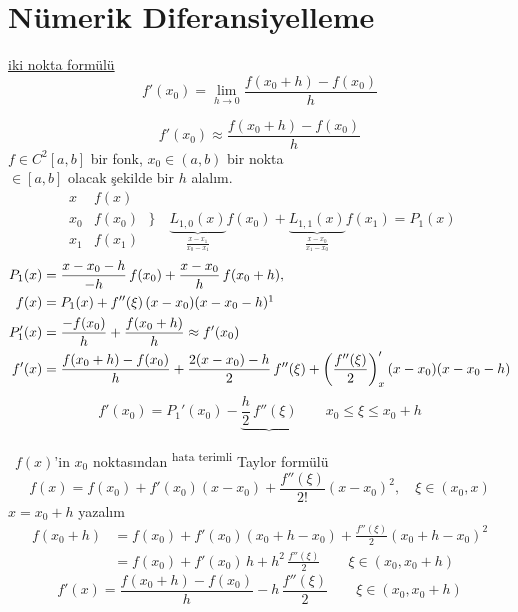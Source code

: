 \documentclass[11pt,a4paper]{article}
\begin{document}

\section{Nümerik Diferansiyelleme}
\noindent\underline{\small iki nokta formülü}
\[
  f'(x_0) = \lim_{h\to 0}\frac{f(x_0+h) - f(x_0)}{h}
\]
\begin{center}
\end{center}
\[
  f'(x_0) \approx \frac{f(x_0+h) - f(x_0)}{h}
\]
$f \in C^2[a,b]$ bir fonk, \quad $x_0 \in (a,b)$ bir nokta\\
 $\in [a,b]$ olacak şekilde bir $h$ alalım.
\[
  \begin{array}{c|c}
    x & f(x)\\ \hline
    x_0 & f(x_0)\\
    x_1 & f(x_1)
  \end{array}
  \;\Bigg\}\quad
  \underbrace{L_{1,0}(x)}_{\frac{x-x_1}{x_0-x_1}}f(x_0) + \underbrace{L_{1,1}(x)}_{\frac{x-x_0}{x_1-x_0}}f(x_1) = P_1(x)
\]
\begin{align*}
  P_1(x) &= \frac{x - x_0 - h}{-h}\,f(x_0) + \frac{x - x_0}{h}\,f(x_0+h),\\
  f(x) &= P_1(x) + f''(\xi)\,(x-x_0)(x-x_0-h)\footnotemark\\
  P_1'(x) &= \frac{-f(x_0)}{h} + \frac{f(x_0+h)}{h} \approx f'(x_0)\\
  f'(x) &= \frac{f(x_0+h) - f(x_0)}{h} + \frac{2(x-x_0) - h}{2}\,f''(\xi)
           + \left(\frac{f''(\xi)}{2}\right)'_x (x-x_0)(x-x_0-h)
\end{align*}
\[
  f'(x_0) = P_1'(x_0) - \underbrace{\frac{h}{2}\,f''(\xi)}_{} \qquad x_0 \le \xi \le x_0 + h
\]

\noindent{} \ $f(x)$'in $x_0$ noktasından \textsuperscript{hata terimli} Taylor formülü
\[
  f(x) = f(x_0) + f'(x_0)(x-x_0) + \frac{f''(\xi)}{2!}(x-x_0)^2, \quad \xi \in (x_0, x)
\]
$x = x_0 + h$ yazalım
\begin{align*}
  f(x_0+h) &= f(x_0) + f'(x_0)(x_0+h-x_0) + \frac{f''(\xi)}{2}(x_0+h-x_0)^2\\
           &= f(x_0) + f'(x_0)\,h + h^2\,\frac{f''(\xi)}{2} \qquad \xi \in (x_0, x_0+h)
\end{align*}
\[
  f'(x) = \frac{f(x_0+h) - f(x_0)}{h} - h\,\frac{f''(\xi)}{2} \qquad \xi \in (x_0, x_0+h)
\]
\end{document}
